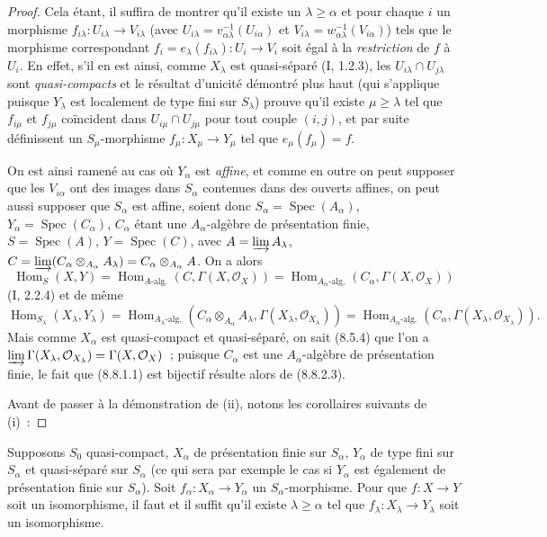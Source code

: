 \begin{proof}
Cela étant, il suffira de montrer qu'il existe un $\lambda\geq\alpha$ et pour
chaque $i$ un morphisme $f_{i\lambda}:U_{i\lambda}\to V_{i\lambda}$ (avec
$U_{i\lambda}=v_{\alpha\lambda}^{-1}(U_{i\alpha})$ et
$V_{i\lambda}=w_{\alpha\lambda}^{-1}(V_{i\alpha})$) tels que le morphisme
correspondant $f_i=e_\lambda(f_{i\lambda}):U_i\to V_i$ soit égal à la
\emph{restriction} de $f$ à $U_i$. En effet, s'il en est ainsi, comme
$X_\lambda$ est quasi-séparé (I, 1.2.3), les
$U_{i\lambda}\cap U_{j\lambda}$ sont \emph{quasi-compacts} et le résultat
d'unicité démontré plus haut (qui s'applique puisque $Y_\lambda$ est
localement de type fini sur $S_\lambda$) prouve qu'il existe
$\mu\geq\lambda$ tel que $f_{i\mu}$ et $f_{j\mu}$ coïncident dans
$U_{i\mu}\cap U_{j\mu}$ pour tout couple $(i,j)$, et par suite définissent un
$S_\mu$-morphisme $f_\mu:X_\mu\to Y_\mu$ tel que $e_\mu(f_\mu)=f$.

On est ainsi ramené au cas où $Y_\alpha$ est \emph{affine}, et comme en outre
on peut supposer que les $V_{i\alpha}$ ont des images dans $S_\alpha$
contenues dans des ouverts affines, on peut aussi supposer que $S_\alpha$ est
affine, soient donc $S_\alpha=\operatorname{Spec}(A_\alpha)$,
$Y_\alpha=\operatorname{Spec}(C_\alpha)$, $C_\alpha$ étant une
$A_\alpha$-algèbre de présentation finie, $S=\operatorname{Spec}(A)$,
$Y=\operatorname{Spec}(C)$, avec $A=\varinjlim A_\lambda$,
$C=\varinjlim(C_\alpha\otimes_{A_\alpha}A_\lambda)=
C_\alpha\otimes_{A_\alpha}A$. On a alors
\[
\operatorname{Hom}_S(X,Y)=
\operatorname{Hom}_{A\text{-alg.}}(C,\Gamma(X,\mathcal O_X))=
\operatorname{Hom}_{A_\alpha\text{-alg.}}(C_\alpha,\Gamma(X,\mathcal O_X))
\]
(I, 2.2.4) et de même
\[
\operatorname{Hom}_{S_\lambda}(X_\lambda,Y_\lambda)=
\operatorname{Hom}_{A_\lambda\text{-alg.}}
(C_\alpha\otimes_{A_\alpha}A_\lambda,\Gamma(X_\lambda,\mathcal O_{X_\lambda}))=
\operatorname{Hom}_{A_\alpha\text{-alg.}}
(C_\alpha,\Gamma(X_\lambda,\mathcal O_{X_\lambda})).
\]
Mais comme $X_\alpha$ est quasi-compact et quasi-séparé, on sait (8.5.4) que
l'on a
$\varinjlim\Gamma(X_\lambda,\mathcal O_{X_\lambda})=
\Gamma(X,\mathcal O_X)$~; puisque $C_\alpha$ est une $A_\alpha$-algèbre de
présentation finie, le fait que (8.8.1.1) est bijectif résulte alors de
(8.8.2.3).

Avant de passer à la démonstration de (ii), notons les corollaires suivants de
(i)~:
\end{proof}

\begin{corollary}[8.8.2.4]
\label{IV.8.8.2.4-fr}
Supposons $S_0$ quasi-compact, $X_\alpha$ de présentation finie sur $S_\alpha$,
$Y_\alpha$ de type fini sur $S_\alpha$ et quasi-séparé sur $S_\alpha$ (ce qui
sera par exemple le cas si $Y_\alpha$ est également
de présentation finie sur $S_\alpha$). Soit
$f_\alpha:X_\alpha\to Y_\alpha$ un $S_\alpha$-morphisme. Pour que
$f:X\to Y$ soit un isomorphisme, il faut et il suffit qu'il existe
$\lambda\geq\alpha$ tel que $f_\lambda:X_\lambda\to Y_\lambda$ soit un
isomorphisme.
\end{corollary}

